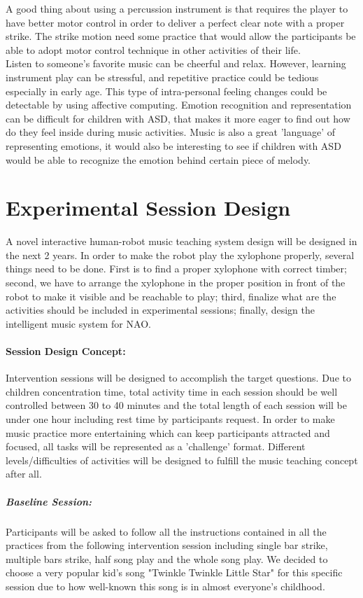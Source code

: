 \documentclass[12pt]{report}
\begin{document}
A good thing about using a percussion instrument is that requires the player to have better
motor control in order to deliver a perfect clear note with a proper strike. The strike motion
need some practice that would allow the participants be able to adopt motor control technique
in other activities of their life.\\

Listen to someone's favorite music can be cheerful and relax. However, learning instrument 
play can be stressful, and repetitive practice could be tedious especially in early age. This 
type of intra-personal feeling changes could be detectable by using affective computing. 
Emotion recognition and representation can be difficult for children with ASD, that makes 
it more eager to find out how do they feel inside during music activities. Music is also
a great 'language' of representing emotions, it would also be interesting to see if children
with ASD would be able to recognize the emotion behind certain piece of melody.

 
\section*{Experimental Session Design}
A novel interactive human-robot music teaching system design will be designed in 
the next 2 years. In order to make the robot play the xylophone properly, several things need 
to be done. First is to find a proper xylophone with correct timber; 
second, we have to arrange the xylophone in the proper position in front of the robot 
to make it visible and be reachable to play; third, finalize what are the activities 
should be included in experimental sessions; finally, design the intelligent music system for NAO.\\

\paragraph{Session Design Concept:}
Intervention sessions will be designed to accomplish the target questions. Due to children
concentration time, total activity time in each session should be well controlled between 
30 to 40 minutes and the total length of each session will be under one hour including rest
time by participants request. In order to make music practice more entertaining which can 
keep participants attracted and focused, all tasks will be represented as a 'challenge' format.
Different levels/difficulties of activities will be designed to fulfill the music teaching
concept after all. \\
\subparagraph{Baseline Session: }Participants will be asked to follow all the 
instructions contained in all the practices from the following intervention session 
including single bar strike, multiple bars strike, half song play and the whole
song play. We decided to choose a very popular kid's song "Twinkle Twinkle Little Star" 
for this specific session due to how well-known this song is in almost 
everyone's childhood.\\
\end{document}
